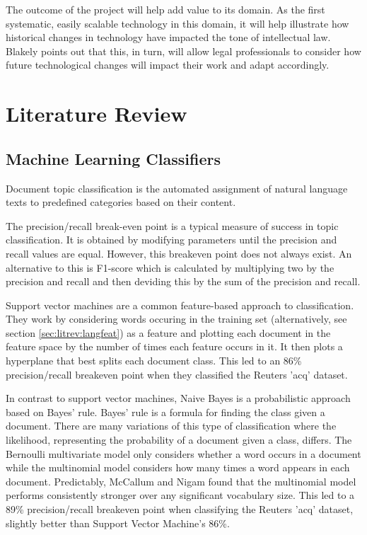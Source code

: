 			The outcome of the project will help add value to its domain. As the first systematic, easily scalable technology in this domain, it will help illustrate how historical changes in technology have impacted the tone of intellectual law. Blakely points out that this, in turn, will allow legal professionals to consider how future technological changes will impact their work and adapt accordingly.
	\section{Literature Review} \label{sec:litrev}	
		\subsection{Machine Learning Classifiers} \label{sec:litrev:mlclass} %
			Document topic classification is the automated assignment of natural language texts to predefined categories based on their content\cite{ml_automated_categorisation}. 
			
			The precision/recall break-even point is a typical measure of success in topic classification\cite{encyc_breakeven_sammut}. It is obtained by modifying parameters until the precision and recall values are equal. However, this breakeven point does not always exist\cite{bigrams_enhance_categorisation}. An alternative to this is F1-score which is calculated by multiplying two by the precision and recall and then deviding this by the sum of the precision and recall. 
		
			Support vector machines are a common feature-based approach to classification. They work by considering words occuring in the training set (alternatively, see section \ref{sec:litrev:langfeat}) as a feature and plotting each document in the feature space by the number of times each feature occurs in it. It then plots a hyperplane that best splits each document class. This led to an 86\% precision/recall breakeven point when they classified the Reuters 'acq' dataset\cite{svm_joachims}. %
			
			In contrast to support vector machines, Naive Bayes is a probabilistic approach based on Bayes' rule. Bayes' rule is a formula for finding the class given a document. There are many variations of this type of classification where the likelihood, representing the probability of a document given a class, differs. The Bernoulli multivariate model only considers whether a word occurs in a document while the multinomial model considers how many times a word appears in each document. Predictably, McCallum and Nigam found that the multinomial model performs consistently stronger over any significant vocabulary size. This led to a 89\% precision/recall breakeven point when classifying the Reuters 'acq' dataset, slightly better than Support Vector Machine's 86\%.%

